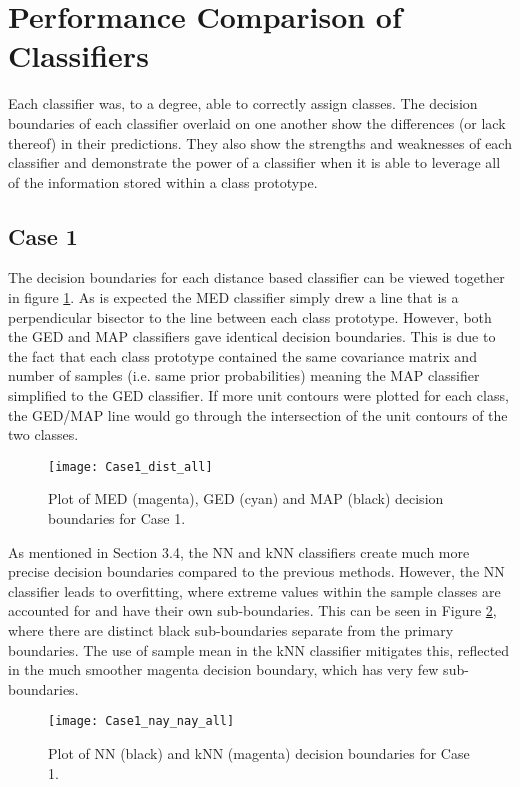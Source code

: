 \documentclass{article}
\begin{document}
\section{Performance Comparison of Classifiers}
Each classifier was, to a degree, able to correctly assign classes. The decision boundaries of each classifier overlaid on one another show the differences (or lack thereof) in their predictions. They also show the strengths and weaknesses of each classifier and demonstrate the power of a classifier when it is able to leverage all of the information stored within a class prototype.

\subsection{Case 1}
The decision boundaries for each distance based classifier can be viewed together in figure \ref{fig:Case1_dist}. As is expected the MED classifier simply drew a line that is a perpendicular bisector to the line between each class prototype. However, both the GED and MAP classifiers gave identical decision boundaries. This is due to the fact that each class prototype contained the same covariance matrix and number of samples (i.e. same prior probabilities) meaning the MAP classifier simplified to the GED classifier. If more unit contours were plotted for each class, the GED/MAP line would go through the intersection of the unit contours of the two classes.

\begin{figure}[H]
    \caption{Plot of MED (magenta), GED (cyan) and MAP (black) decision boundaries for Case 1.}
    \centering
    \texttt{[image: Case1\_dist\_all]}
    \label{fig:Case1_dist}
\end{figure}

As mentioned in Section 3.4, the NN and kNN classifiers create much more precise decision boundaries compared to the previous methods. However, the NN classifier leads to overfitting, where extreme values within the sample classes are accounted for and have their own sub-boundaries. This can be seen in Figure \ref{fig:Case1_nay_nay}, where there are distinct black sub-boundaries separate from the primary boundaries. The use of sample mean in the kNN classifier mitigates this, reflected in the much smoother magenta decision boundary, which has very few sub-boundaries.

\begin{figure}[H]
    \caption{Plot of NN (black) and kNN (magenta) decision boundaries for Case 1.}
    \centering
    \texttt{[image: Case1\_nay\_nay\_all]}
    \label{fig:Case1_nay_nay}
\end{figure}
\end{document}
